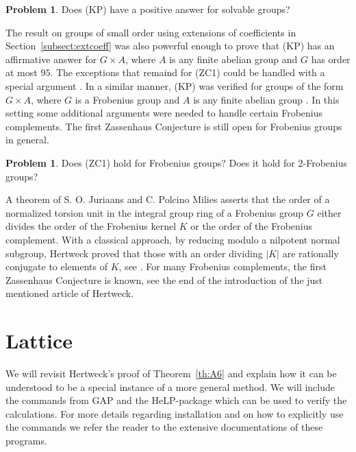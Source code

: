 \documentclass[10pt,a4paper,reqno]{amsart}
\theoremstyle{definition}
\newtheorem{problem}[theorem]{Problem}
\theoremstyle{remark}
\begin{document}
\begin{problem} Does (KP) have a positive answer for solvable groups?\end{problem}

The result on groups of small order using extensions of coefficients in Section~\ref{subsect:extcoeff} was also powerful enough to prove that (KP) has an affirmative answer for $G \times A$, where $A$ is any finite abelian group and $G$ has order at most $95$. The exceptions that remaind for (ZC1) could be handled with a special argument \cite[Theorem~5.18]{BKS20}. In a similar manner, (KP) was verified for groups of the form $G\times A$, where $G$ is a Frobenius group and $A$ is any finite abelian group \cite[Theorem~5.17]{BKS20}. In this setting some additional arguments were needed to handle certain Frobenius complements. The first Zassenhaus Conjecture is still open for Frobenius groups in general.
%
\begin{problem}
 Does (ZC1) hold for Frobenius groups? Does it hold for $2$-Frobenius groups?
\end{problem}
%
A theorem of S. O. Juriaans and C. Polcino Milies \cite{JPM00} asserts that the order of a normalized torsion unit in the integral group ring of a Frobenius group $G$ either divides the order of the Frobenius kernel $K$ or the order of the Frobenius complement. With a classical approach, by reducing modulo a nilpotent normal subgroup, Hertweck proved that those with an order dividing $|K|$ are rationally conjugate to elements of $K$, see \cite{Her12}. For many Frobenius complements, the first Zassenhaus Conjecture is known, see the end of the introduction of the just mentioned article of Hertweck.




\section{Lattice}\label{sec:Lattice}

We will revisit Hertweck's proof of Theorem~\ref{th:A6} and explain how it can be understood to be a special instance of a more general method. We will include the commands from \textsf{GAP} and the \textsf{HeLP}-package which can be used to verify the calculations. For more details regarding installation and on how to explicitly use the commands we refer the reader to the extensive documentations of these programs.
\end{document}
